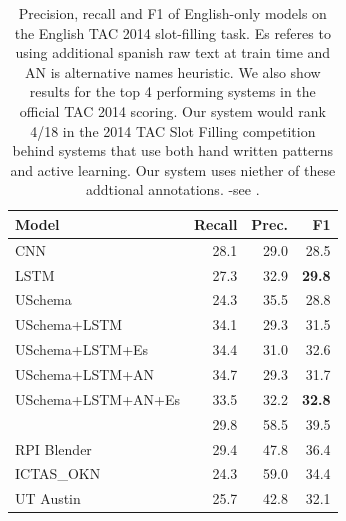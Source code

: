 \begin{table}[tb]
\begin{center}
\caption{Precision, recall and F1 of English-only models on the English TAC 2014 slot-filling task. Es referes to using additional spanish raw text at train time and AN is alternative names heuristic. We also show results for the top 4 performing systems in the official TAC 2014 scoring. Our system would rank 4/18 in the 2014 TAC Slot Filling competition behind systems that use both hand written patterns and active learning. Our system uses niether of these addtional annotations. -see  \protect\cite{SurdeanuMihai2014}. \label{2014-en-tac-table}}
\begin{tabular}{|lrrr|}
\hline
\bf Model & \bf Recall & \bf Prec. & \bf F1 \\
\hline\hline
CNN                 & 28.1 & 29.0 & 28.5 \\
LSTM                & 27.3 & 32.9 & \bf 29.8  \\
USchema             & 24.3 & 35.5 & 28.8 \\
\hline\hline
USchema+LSTM        & 34.1 & 29.3 & 31.5 \\
USchema+LSTM+Es        & 34.4 & 31.0 & 32.6 \\
USchema+LSTM+AN        & 34.7 & 29.3 & 31.7 \\
USchema+LSTM+AN+Es        & 33.5 & 32.2 & \bf 32.8 \\
\hline\hline
\citet{angeli2014stanford} & 29.8 & 58.5 & 39.5 \\
RPI Blender & 29.4 & 47.8 & 36.4 \\
ICTAS\_OKN & 24.3 & 59.0 & 34.4 \\
UT Austin & 25.7 & 42.8 & 32.1 \\
\hline
\end{tabular}
\end{center}
\end{table}





